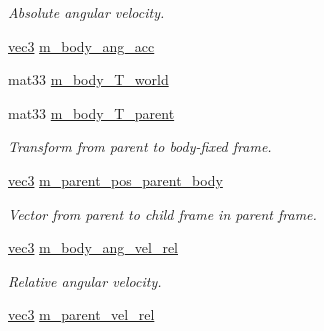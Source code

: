 \begin{CompactItemize}
\begin{CompactList}\small\item\em Absolute angular velocity. \item\end{CompactList}\item 
\hyperlink{classbt_inverse_dynamics_1_1vec3}{vec3} \hyperlink{structbt_inverse_dynamics_1_1_rigid_body_8d32f2b5bcdf5f3a2566343de43ebb71}{m\_\-body\_\-ang\_\-acc}
\item 
mat33 \hyperlink{structbt_inverse_dynamics_1_1_rigid_body_c923bac96faf25c431d498493ed9ff0e}{m\_\-body\_\-T\_\-world}
\item 
\hypertarget{structbt_inverse_dynamics_1_1_rigid_body_c8807fda3577ce44b4acb5eb4467630e}{
mat33 \hyperlink{structbt_inverse_dynamics_1_1_rigid_body_c8807fda3577ce44b4acb5eb4467630e}{m\_\-body\_\-T\_\-parent}}
\label{structbt_inverse_dynamics_1_1_rigid_body_c8807fda3577ce44b4acb5eb4467630e}

\begin{CompactList}\small\item\em Transform from parent to body-fixed frame. \item\end{CompactList}\item 
\hypertarget{structbt_inverse_dynamics_1_1_rigid_body_cc114bbf3c15e79439d323a0559d85ce}{
\hyperlink{classbt_inverse_dynamics_1_1vec3}{vec3} \hyperlink{structbt_inverse_dynamics_1_1_rigid_body_cc114bbf3c15e79439d323a0559d85ce}{m\_\-parent\_\-pos\_\-parent\_\-body}}
\label{structbt_inverse_dynamics_1_1_rigid_body_cc114bbf3c15e79439d323a0559d85ce}

\begin{CompactList}\small\item\em Vector from parent to child frame in parent frame. \item\end{CompactList}\item 
\hypertarget{structbt_inverse_dynamics_1_1_rigid_body_17c7199923a969db2fb6a2fc51677257}{
\hyperlink{classbt_inverse_dynamics_1_1vec3}{vec3} \hyperlink{structbt_inverse_dynamics_1_1_rigid_body_17c7199923a969db2fb6a2fc51677257}{m\_\-body\_\-ang\_\-vel\_\-rel}}
\label{structbt_inverse_dynamics_1_1_rigid_body_17c7199923a969db2fb6a2fc51677257}

\begin{CompactList}\small\item\em Relative angular velocity. \item\end{CompactList}\item 
\hypertarget{structbt_inverse_dynamics_1_1_rigid_body_b134cf736fce044e8e1d58ccfb67c7cb}{
\hyperlink{classbt_inverse_dynamics_1_1vec3}{vec3} \hyperlink{structbt_inverse_dynamics_1_1_rigid_body_b134cf736fce044e8e1d58ccfb67c7cb}{m\_\-parent\_\-vel\_\-rel}}
\label{structbt_inverse_dynamics_1_1_rigid_body_b134cf736fce044e8e1d58ccfb67c7cb}


\end{CompactItemize}

